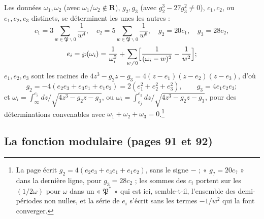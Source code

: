 \documentclass[11pt,a4paper]{article}
\begin{document}
Les données $\omega_1, \omega_2$ (avec
$\omega_1/\omega_2 \notin \mathbf{R}$), $g_2, g_3$ (avec $g_2^3 - 27g_3^2 \neq
0$), $c_1, c_2$, ou $e_1, e_2, e_3$ distincts, se déterminent les unes les
autres :
\[
c_1 = 3\sum_{w \in \mathfrak{P}\smallsetminus 0}\frac{1}{w^4}, \quad c_2 =
5\sum_{w \in \mathfrak{P}\smallsetminus 0}\frac{1}{w^6}, \quad g_2 = 20c_1,
\quad g_3 = 28c_2,
\]
\[
e_i = \wp(\omega_i) = \frac{1}{\omega_i^2} + \sum_{w
\neq 0}\Bigl[\frac{1}{(\omega_i - w)^2} - \frac{1}{w^2}\Bigr] ;
\]
$e_1, e_2, e_3$ sont les racines de $4z^3 - g_2z - g_3 = 4(z - e_1)(z - e_2)(z -
e_3)$, d'où
\[
g_2 = -4(e_2e_3 + e_3e_1 + e_1e_2) = 2(e_1^2 + e_2^2 + e_3^2), \qquad g_3 =
4e_1e_2e_3 ;
\]
et $\omega_i = \int_\infty^{e_i} dz/\sqrt{4z^3 - g_2z - g_3}$, ou $\omega_i =
\int_{e_j}^{e_k}dz/\sqrt{4z^3 - g_2z - g_3}$, pour des déterminations convenables
avec $\omega_1 + \omega_2 + \omega_3 = 0$.\footnote{La page écrit $g_2 = 4(e_2e_3
+ e_3e_1 + e_1e_2)$, sans le signe $-$ ; « $g_? = 20c_?$ » dans la dernière
ligne, pour $g_3 = 28c_2$ ; les sommes des $c_i$ portent sur les $(1/2\omega)$
pour $\omega$ dans un « $\mathfrak{P}^*$ » qui est ici, semble-t-il, l'ensemble
des demi-périodes non nulles, et la série de $e_i$ s'écrit sans les termes
$-1/w^2$ qui la font converger.}

\subsection*{La fonction modulaire (pages 91 et 92)}
\end{document}
